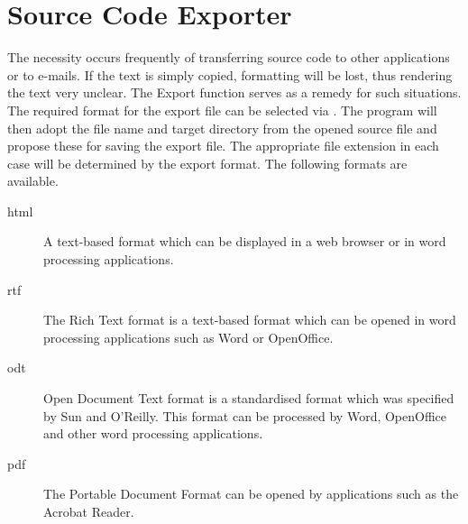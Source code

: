 \section{Source Code Exporter}\label{sec:src_exporter}

The necessity occurs frequently of transferring source code to other applications or to e-mails. If the text is simply copied, formatting will be lost, thus rendering the text very unclear.
The \codeblocks Export function serves as a remedy for such situations. The required format for the export file can be selected via . The program will then adopt the file name and target directory from the opened source file and propose these for saving the export file. The appropriate file extension in each case will be determined by the export format. The following formats are available.

\begin{description}
\item[html] A text-based format which can be displayed in a web browser or in word processing applications.
\item[rtf] The Rich Text format is a text-based format which can be opened in word processing applications such as Word or OpenOffice.
\item[odt] Open Document Text format is a standardised format which was specified by Sun and O'Reilly. This format can be processed by Word, OpenOffice and other word processing applications.
\item[pdf] The Portable Document Format can be opened by applications such as the Acrobat Reader.
\end{description}
